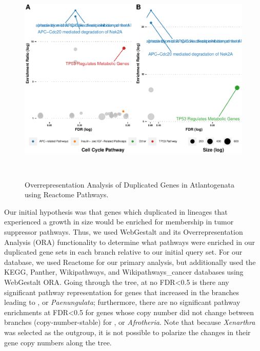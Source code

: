 \documentclass[]{elsarticle} %
\begin{document}
\begin{figure}

\includegraphics[width=6in,height=4in]{paper_PLOS_draft_files/figure-latex/Figure5-1} \hfill{}

\caption{Overrepresentation Analysis of Duplicated Genes in Atlantogenata using Reactome Pathways.}\label{fig:Figure5}
\end{figure}

Our initial hypothesis was that genes which duplicated in lineages that
experienced a growth in size would be enriched for membership in tumor
suppressor pathways. Thus, we used WebGestalt and its Overrepresentation
Analysis (ORA) functionality to determine what pathways were enriched in
our duplicated gene sets in each branch relative to our initial query
set. For our database, we used Reactome for our primary analysis, but
additionally used the KEGG, Panther, Wikipathways, and
Wikipathways\_cancer databases using WebGestalt ORA. Going through the
tree, at no FDR\textless{}0.5 is there any significant pathway
representation for genes that increased in the branches leading to , or
\emph{Paenungulata}; furthermore, there are no significant pathway
enrichments at FDR\textless{}0.5 for genes whose copy number did not
change between branches (copy-number-stable) for , or \emph{Afrotheria}.
Note that because \emph{Xenarthra} was selected as the outgroup, it is
not possible to polarize the changes in their gene copy numbers along
the tree.
\end{document}
